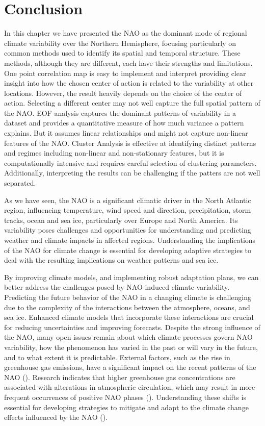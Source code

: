 \documentclass[
]{krantz}
\begin{document}
\section{Conclusion}\label{conclusion-2}

In this chapter we have presented the NAO as the dominant mode of regional climate variability over the Northern Hemisphere, focusing particularly on common methods used to identify its spatial and temporal structure. These methods, although they are different, each have their strengths and limitations.
One point correlation map is easy to implement and interpret providing clear insight into how the chosen center of action is related to the variability at other locations. However, the result heavily depends on the choice of the center of action. Selecting a different center may not well capture the full spatial pattern of the NAO. EOF analysis captures the dominant patterns of variability in a dataset and provides a quantitative measure of how much variance a pattern explains. But it assumes linear relationships and might not capture non-linear features of the NAO. Cluster Analysis is effective at identifying distinct patterns and regimes including non-linear and non-stationary features, but it is computationally intensive and requires careful selection of clustering parameters. Additionally, interpreting the results can be challenging if the patters are not well separated.

As we have seen, the NAO is a significant climatic driver in the North Atlantic region, influencing temperature, wind speed and direction, precipitation, storm tracks, ocean and sea ice, particularly over Europe and North America. Its variability poses challenges and opportunities for understanding and predicting weather and climate impacts in affected regions. Understanding the implications of the NAO for climate change is essential for developing adaptive strategies to deal with the resulting implications on weather patterns and sea ice.

By improving climate models, and implementing robust adaptation plans, we can better address the challenges posed by NAO-induced climate variability. Predicting the future behavior of the NAO in a changing climate is challenging due to the complexity of the interactions between the atmosphere, oceans, and sea ice. Enhanced climate models that incorporate these interactions are crucial for reducing uncertainties and improving forecasts. Despite the strong influence of the NAO, many open issues remain about which climate processes govern NAO variability, how the phenomenon has varied in the past or will vary in the future, and to what extent it is predictable. External factors, such as the rise in greenhouse gas emissions, have a significant impact on the recent patterns of the NAO (\citet{gillett2003}). Research indicates that higher greenhouse gas concentrations are associated with alterations in atmospheric circulation, which may result in more frequent occurrences of positive NAO phases (\citet{gillett2003}). Understanding these shifts is essential for developing strategies to mitigate and adapt to the climate change effects influenced by the NAO (\citet{gillett2003}).
\end{document}
